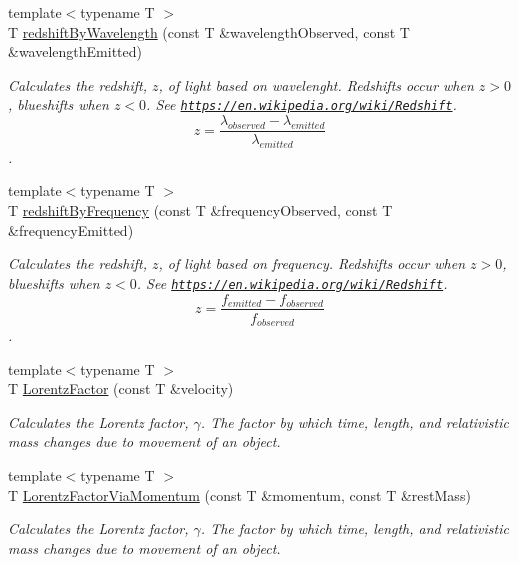\begin{DoxyCompactItemize}
\item 
{\footnotesize template$<$typename T $>$ }\\T \hyperlink{group___optics_ga29300a13e34da35332ca2d447b5ce82d}{redshift\+By\+Wavelength} (const T \&wavelength\+Observed, const T \&wavelength\+Emitted)
\begin{DoxyCompactList}\small\item\em Calculates the redshift, $z$, of light based on wavelenght. Redshifts occur when $z > 0$, blueshifts when $z < 0$. See \href{https://en.wikipedia.org/wiki/Redshift}{\tt https\+://en.\+wikipedia.\+org/wiki/\+Redshift}. \[z=\frac{\lambda_{observed}-\lambda_{emitted}}{\lambda_{emitted}}\]. \end{DoxyCompactList}\item 
{\footnotesize template$<$typename T $>$ }\\T \hyperlink{group___optics_gacc6d3b2922061214d64b89a4b8e3967a}{redshift\+By\+Frequency} (const T \&frequency\+Observed, const T \&frequency\+Emitted)
\begin{DoxyCompactList}\small\item\em Calculates the redshift, $z$, of light based on frequency. Redshifts occur when $z > 0$, blueshifts when $z < 0$. See \href{https://en.wikipedia.org/wiki/Redshift}{\tt https\+://en.\+wikipedia.\+org/wiki/\+Redshift}. \[z=\frac{f_{emitted}-f_{observed}}{f_{observed}}\]. \end{DoxyCompactList}\item 
{\footnotesize template$<$typename T $>$ }\\T \hyperlink{group___relativity_ga5f9b11c1f4c3ae26a7e64f02c22d5a75}{Lorentz\+Factor} (const T \&velocity)
\begin{DoxyCompactList}\small\item\em Calculates the Lorentz factor, $\gamma$. The factor by which time, length, and relativistic mass changes due to movement of an object. \end{DoxyCompactList}\item 
{\footnotesize template$<$typename T $>$ }\\T \hyperlink{group___relativity_ga1ea24128654ac333dd843afdd5c003b7}{Lorentz\+Factor\+Via\+Momentum} (const T \&momentum, const T \&rest\+Mass)
\begin{DoxyCompactList}\small\item\em Calculates the Lorentz factor, $\gamma$. The factor by which time, length, and relativistic mass changes due to movement of an object. \end{DoxyCompactList}\item 

\end{DoxyCompactItemize}
